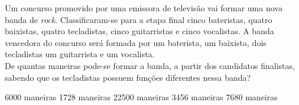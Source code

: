 Um concurso promovido por uma emissora de televisão vai formar uma nova banda de {\it rock}. Classificaram-se para a etapa final cinco bateristas, quatro baixistas, quatro tecladistas, cinco guitarristas e cinco vocalistas. A banda vencedora do concurso será formada por um baterista, um baixista, dois tecladistas um guitarrista e um vocalista.\\De quantas maneiras pode-se formar a banda, a partir dos candidatos finalistas, sabendo que os tecladistas possuem funções diferentes nessa banda?

6000 maneiras
1728 maneiras
22500 maneiras
3456 maneiras
7680 maneiras



